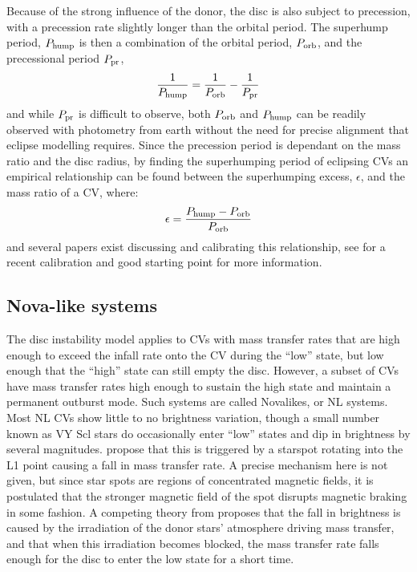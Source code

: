 Because of the strong influence of the donor, the disc is also subject to precession, with a precession rate slightly longer than the orbital period. The superhump period, $P_{\rm hump}$ is then a combination of the orbital period, $P_{\rm orb}$, and the precessional period $P_{\rm pr}$,
\begin{equation}
    \frac{1}{P_{\rm hump}} = \frac{1}{P_{\rm orb}} - \frac{1}{P_{\rm pr}}
\end{equation}
and while $P_{\rm pr}$ is difficult to observe, both $P_{\rm orb}$ and $P_{\rm hump}$ can be readily observed with photometry from earth without the need for precise alignment that eclipse modelling requires. Since the precession period is dependant on the mass ratio and the disc radius, by finding the superhumping period of eclipsing CVs an empirical relationship can be found between the superhumping excess, $\epsilon$, and the mass ratio of a CV, where:
\begin{equation}
    \epsilon = \frac{P_{\rm hump} - P_{\rm orb}}{P_{\rm orb}}
\end{equation}
and several papers exist discussing and calibrating this relationship, see \citet{McAllister2019} for a recent calibration and good starting point for more information.


\subsection{Nova-like systems}

The disc instability model applies to CVs with mass transfer rates that are high enough to exceed the infall rate onto the CV during the ``low'' state, but low enough that the ``high'' state can still empty the disc. However, a subset of CVs have mass transfer rates high enough to sustain the high state and maintain a permanent outburst mode. Such systems are called Novalikes, or NL systems. Most NL CVs show little to no brightness variation, though a small number known as VY Scl stars do occasionally enter ``low'' states and dip in brightness by several magnitudes. \citet{livio1994} propose that this is triggered by a starspot rotating into the L1 point causing a fall in mass transfer rate. A precise mechanism here is not given, but since star spots are regions of concentrated magnetic fields, it is postulated that the stronger magnetic field of the spot disrupts magnetic braking in some fashion. A competing theory from \citet{wu1995} proposes that the fall in brightness is caused by the irradiation of the donor stars' atmosphere driving mass transfer, and that when this irradiation becomes blocked, the mass transfer rate falls enough for the disc to enter the low state for a short time.



